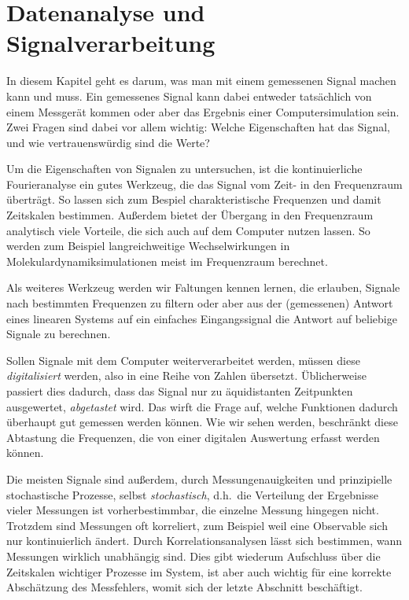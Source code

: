 % 

\chapter{Datenanalyse und Signalverarbeitung}

In diesem Kapitel geht es darum, was man mit einem gemessenen Signal
machen kann und muss. Ein gemessenes Signal kann dabei entweder
tatsächlich von einem Messgerät kommen oder aber das Ergebnis einer
Computersimulation sein. Zwei Fragen sind dabei vor allem wichtig:
Welche Eigenschaften hat das Signal, und wie vertrauenswürdig sind die
Werte?

Um die Eigenschaften von Signalen zu untersuchen, ist die
kontinuierliche Fourieranalyse ein gutes Werkzeug, die das Signal vom
Zeit- in den Frequenzraum überträgt. So lassen sich zum Bespiel
charakteristische Frequenzen und damit Zeitskalen bestimmen. Außerdem
bietet der Übergang in den Frequenzraum analytisch viele Vorteile, die
sich auch auf dem Computer nutzen lassen. So werden zum Beispiel
langreichweitige Wechselwirkungen in Molekulardynamiksimulationen
meist im Frequenzraum berechnet.

Als weiteres Werkzeug werden wir Faltungen kennen lernen, die
erlauben, Signale nach bestimmten Frequenzen zu filtern oder aber aus
der (gemessenen) Antwort eines linearen Systems auf ein einfaches
Eingangssignal die Antwort auf beliebige Signale zu berechnen.

Sollen Signale mit dem Computer weiterverarbeitet werden, müssen diese
\emph{digitalisiert} werden, also in eine Reihe von Zahlen
übersetzt. Üblicherweise passiert dies dadurch, dass das Signal nur zu
äquidistanten Zeitpunkten ausgewertet, \emph{abgetastet} wird. Das
wirft die Frage auf, welche Funktionen dadurch überhaupt gut gemessen
werden können. Wie wir sehen werden, beschränkt diese Abtastung die
Frequenzen, die von einer digitalen Auswertung erfasst werden können.

Die meisten Signale sind außerdem, durch Messungenauigkeiten und
prinzipielle stochastische Prozesse, selbst \emph{stochastisch},
d.h.\ die Verteilung der Ergebnisse vieler Messungen ist
vorherbestimmbar, die einzelne Messung hingegen nicht. Trotzdem sind
Messungen oft korreliert, zum Beispiel weil eine Observable sich nur
kontinuierlich ändert.  Durch Korrelationsanalysen lässt sich
bestimmen, wann Messungen wirklich unabhängig sind. Dies gibt wiederum
Aufschluss über die Zeitskalen wichtiger Prozesse im System, ist aber
auch wichtig für eine korrekte Abschätzung des Messfehlers, womit sich
der letzte Abschnitt beschäftigt.

